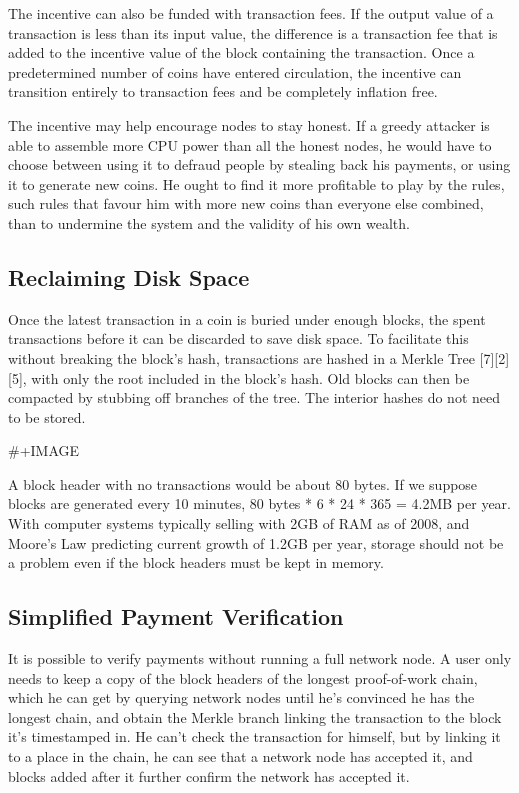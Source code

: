 \documentclass[11pt]{article}
\begin{document}
The incentive can also be funded with transaction fees.
If the output value of a transaction is less than its input value, the difference is a transaction fee that is added to the incentive value of the block containing the transaction.
Once a predetermined number of coins have entered circulation, the incentive can transition entirely to transaction fees and be completely inflation free.

The incentive may help encourage nodes to stay honest.
If a greedy attacker is able to assemble more CPU power than all the honest nodes, he would have to choose between using it to defraud people by stealing back his payments, or using it to generate new coins.
He ought to find it more profitable to play by the rules, such rules that favour him with more new coins than everyone else combined, than to undermine the system and the validity of his own wealth.

\subsection{Reclaiming Disk Space}
\label{sec:orgfae3328}
Once the latest transaction in a coin is buried under enough blocks, the spent transactions before it can be discarded to save disk space.
To facilitate this without breaking the block's hash, transactions are hashed in a Merkle Tree [7][2][5], with only the root included in the block's hash.
Old blocks can then be compacted by stubbing off branches of the tree.
The interior hashes do not need to be stored.

\#+IMAGE

A block header with no transactions would be about 80 bytes.
If we suppose blocks are generated every 10 minutes, 80 bytes * 6 * 24 * 365 = 4.2MB per year.
With computer systems typically selling with 2GB of RAM as of 2008, and Moore's Law predicting current growth of 1.2GB per year, storage should not be a problem even if the block headers must be kept in memory.

\subsection{Simplified Payment Verification}
\label{sec:orge89011c}
It is possible to verify payments without running a full network node.
A user only needs to keep a copy of the block headers of the longest proof-of-work chain, which he can get by querying network nodes until he's convinced he has the longest chain, and obtain the Merkle branch linking the transaction to the block it's timestamped in.
He can't check the transaction for himself, but by linking it to a place in the chain, he can see that a network node has accepted it, and blocks added after it further confirm the network has accepted it.
\end{document}
